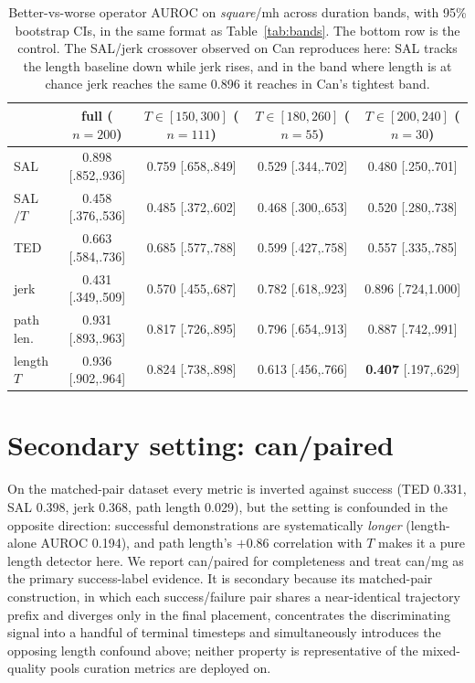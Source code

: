 \documentclass[10pt]{article}
\begin{document}
\begin{table}[h]
\centering
\small
\begin{tabular}{lcccc}
\toprule
& full ($n{=}200$) & $T \in [150,300]$ ($n{=}111$) & $T \in [180,260]$ ($n{=}55$) & $T \in [200,240]$ ($n{=}30$) \\
\midrule
SAL       & 0.898 [.852,.936] & 0.759 [.658,.849] & 0.529 [.344,.702] & 0.480 [.250,.701] \\
SAL$/T$   & 0.458 [.376,.536] & 0.485 [.372,.602] & 0.468 [.300,.653] & 0.520 [.280,.738] \\
TED       & 0.663 [.584,.736] & 0.685 [.577,.788] & 0.599 [.427,.758] & 0.557 [.335,.785] \\
jerk      & 0.431 [.349,.509] & 0.570 [.455,.687] & 0.782 [.618,.923] & 0.896 [.724,1.000] \\
path len. & 0.931 [.893,.963] & 0.817 [.726,.895] & 0.796 [.654,.913] & 0.887 [.742,.991] \\
\midrule
length $T$ & 0.936 [.902,.964] & 0.824 [.738,.898] & 0.613 [.456,.766] & \textbf{0.407} [.197,.629] \\
\bottomrule
\end{tabular}
\caption{Better-vs-worse operator AUROC on \emph{square}/mh across duration
bands, with 95\% bootstrap CIs, in the same format as
Table~\ref{tab:bands}. The bottom row is the control. The SAL/jerk
crossover observed on Can reproduces here: SAL tracks the length baseline
down while jerk rises, and in the band where length is at chance jerk
reaches the same 0.896 it reaches in Can's tightest band.}
\label{tab:square}
\end{table}

\section{Secondary setting: can/paired}
\label{app:paired}

On the matched-pair dataset every metric is inverted against success (TED
0.331, SAL 0.398, jerk 0.368, path length 0.029), but the setting is
confounded in the opposite direction: successful demonstrations are
systematically \emph{longer} (length-alone AUROC 0.194), and path length's
$+0.86$ correlation with $T$ makes it a pure length detector here. We
report can/paired for completeness and treat can/mg as the primary
success-label evidence. It is secondary because its matched-pair
construction, in which each success/failure pair shares a near-identical
trajectory prefix and diverges only in the final placement, concentrates
the discriminating signal into a handful of terminal timesteps and
simultaneously introduces the opposing length confound above; neither
property is representative of the mixed-quality pools curation metrics are
deployed on.
\end{document}
